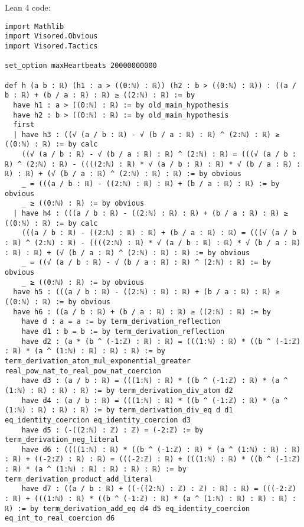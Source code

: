 \documentclass{article}
\begin{document}
Lean 4 code:
\begin{tcolorbox}[colback=white!10, width=\linewidth]
\begin{lstlisting}[language=Lean4]
import Mathlib
import Visored.Obvious
import Visored.Tactics

set_option maxHeartbeats 20000000000

def h (a b : ℝ) (h1 : a > ((0:ℕ) : ℝ)) (h2 : b > ((0:ℕ) : ℝ)) : ((a / b : ℝ) + (b / a : ℝ) : ℝ) ≥ ((2:ℕ) : ℝ) := by
  have h1 : a > ((0:ℕ) : ℝ) := by old_main_hypothesis
  have h2 : b > ((0:ℕ) : ℝ) := by old_main_hypothesis
  first
  | have h3 : ((√ (a / b : ℝ) - √ (b / a : ℝ) : ℝ) ^ (2:ℕ) : ℝ) ≥ ((0:ℕ) : ℝ) := by calc
    ((√ (a / b : ℝ) - √ (b / a : ℝ) : ℝ) ^ (2:ℕ) : ℝ) = (((√ (a / b : ℝ) ^ (2:ℕ) : ℝ) - ((((2:ℕ) : ℝ) * √ (a / b : ℝ) : ℝ) * √ (b / a : ℝ) : ℝ) : ℝ) + (√ (b / a : ℝ) ^ (2:ℕ) : ℝ) : ℝ) := by obvious
    _ = (((a / b : ℝ) - ((2:ℕ) : ℝ) : ℝ) + (b / a : ℝ) : ℝ) := by obvious
    _ ≥ ((0:ℕ) : ℝ) := by obvious
  | have h4 : (((a / b : ℝ) - ((2:ℕ) : ℝ) : ℝ) + (b / a : ℝ) : ℝ) ≥ ((0:ℕ) : ℝ) := by calc
    (((a / b : ℝ) - ((2:ℕ) : ℝ) : ℝ) + (b / a : ℝ) : ℝ) = (((√ (a / b : ℝ) ^ (2:ℕ) : ℝ) - ((((2:ℕ) : ℝ) * √ (a / b : ℝ) : ℝ) * √ (b / a : ℝ) : ℝ) : ℝ) + (√ (b / a : ℝ) ^ (2:ℕ) : ℝ) : ℝ) := by obvious
    _ = ((√ (a / b : ℝ) - √ (b / a : ℝ) : ℝ) ^ (2:ℕ) : ℝ) := by obvious
    _ ≥ ((0:ℕ) : ℝ) := by obvious
  have h5 : (((a / b : ℝ) - ((2:ℕ) : ℝ) : ℝ) + (b / a : ℝ) : ℝ) ≥ ((0:ℕ) : ℝ) := by obvious
  have h6 : ((a / b : ℝ) + (b / a : ℝ) : ℝ) ≥ ((2:ℕ) : ℝ) := by
    have d : a = a := by term_derivation_reflection
    have d1 : b = b := by term_derivation_reflection
    have d2 : (a * (b ^ (-1:ℤ) : ℝ) : ℝ) = (((1:ℕ) : ℝ) * ((b ^ (-1:ℤ) : ℝ) * (a ^ (1:ℕ) : ℝ) : ℝ) : ℝ) := by term_derivation_atom_mul_exponential_greater real_pow_nat_to_real_pow_nat_coercion
    have d3 : (a / b : ℝ) = (((1:ℕ) : ℝ) * ((b ^ (-1:ℤ) : ℝ) * (a ^ (1:ℕ) : ℝ) : ℝ) : ℝ) := by term_derivation_div_atom d2
    have d4 : (a / b : ℝ) = (((1:ℕ) : ℝ) * ((b ^ (-1:ℤ) : ℝ) * (a ^ (1:ℕ) : ℝ) : ℝ) : ℝ) := by term_derivation_div_eq d d1 eq_identity_coercion eq_identity_coercion d3
    have d5 : (-((2:ℕ) : ℤ) : ℤ) = (-2:ℤ) := by term_derivation_neg_literal
    have d6 : ((((1:ℕ) : ℝ) * ((b ^ (-1:ℤ) : ℝ) * (a ^ (1:ℕ) : ℝ) : ℝ) : ℝ) + ((-2:ℤ) : ℝ) : ℝ) = (((-2:ℤ) : ℝ) + (((1:ℕ) : ℝ) * ((b ^ (-1:ℤ) : ℝ) * (a ^ (1:ℕ) : ℝ) : ℝ) : ℝ) : ℝ) := by term_derivation_product_add_literal
    have d7 : ((a / b : ℝ) + ((-((2:ℕ) : ℤ) : ℤ) : ℝ) : ℝ) = (((-2:ℤ) : ℝ) + (((1:ℕ) : ℝ) * ((b ^ (-1:ℤ) : ℝ) * (a ^ (1:ℕ) : ℝ) : ℝ) : ℝ) : ℝ) := by term_derivation_add_eq d4 d5 eq_identity_coercion eq_int_to_real_coercion d6

\end{lstlisting}
\end{tcolorbox}
\end{document}
